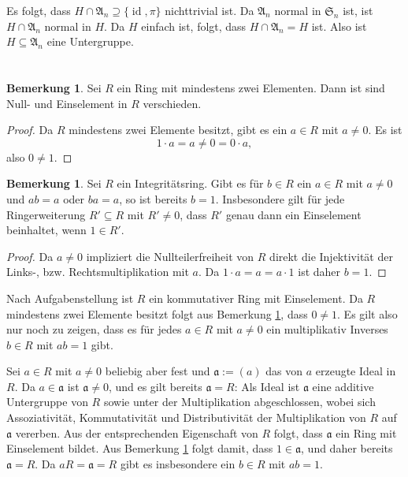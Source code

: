 \documentclass[a4paper,10pt]{article}
\theoremstyle{definition}
\newtheorem{bem}[beh]{Bemerkung}
\newcommand{\Sn}{\mathfrak{S}}
\newcommand{\mf}[1]{\mathfrak{#1}}
\newcommand{\id}{\operatorname{id}}
\begin{document}
Es folgt, dass $H \cap \mf{A}_n \supseteq \{\id, \pi\}$ nichttrivial ist. Da $\mf{A}_n$ normal in $\Sn_n$ ist, ist $H \cap \mf{A}_n$ normal in $H$. Da $H$ einfach ist, folgt, dass $H \cap \mf{A}_n = H$ ist. Also ist $H \subseteq \mf{A}_n$ eine Untergruppe.





\section{}

\begin{bem}\label{bem: 0 neq 1}
 Sei $R$ ein Ring mit mindestens zwei Elementen. Dann ist sind Null- und Einselement in $R$ verschieden.
\end{bem}
\begin{proof}
 Da $R$ mindestens zwei Elemente besitzt, gibt es ein $a \in R$ mit $a \neq 0$. Es ist
 \[
  1 \cdot a = a \neq 0 = 0 \cdot a,
 \]
 also $0 \neq 1$.
\end{proof}

\begin{bem}\label{bem: 1 ohne nullteiler eindeutig}
 Sei $R$ ein Integritätsring. Gibt es für $b \in R$ ein $a \in R$ mit $a \neq 0$ und $ab = a$ oder $ba = a$, so ist bereits $b = 1$. Insbesondere gilt für jede Ringerweiterung $R' \subseteq R$ mit $R' \neq 0$, dass $R'$ genau dann ein Einselement beinhaltet, wenn $1 \in R'$.
 \begin{proof}
  Da $a \neq 0$ impliziert die Nullteilerfreiheit von $R$ direkt die Injektivität der Links-, bzw. Rechtsmultiplikation mit $a$. Da $1 \cdot a = a = a \cdot 1$ ist daher $b = 1$.
 \end{proof}
\end{bem}


Nach Aufgabenstellung ist $R$ ein kommutativer Ring mit Einselement. Da $R$ mindestens zwei Elemente besitzt folgt aus Bemerkung \ref{bem: 0 neq 1}, dass $0 \neq 1$. Es gilt also nur noch zu zeigen, dass es für jedes $a \in R$ mit $a \neq 0$ ein multiplikativ Inverses $b \in R$ mit $ab = 1$ gibt.

Sei $a \in R$ mit $a \neq 0$ beliebig aber fest und $\mf{a} := (a)$ das von $a$ erzeugte Ideal in $R$. Da $a \in \mf{a}$ ist $\mf{a} \neq 0$, und es gilt bereits $\mf{a} = R$: Als Ideal ist $\mf{a}$ eine additive Untergruppe von $R$ sowie unter der Multiplikation abgeschlossen, wobei sich Assoziativität, Kommutativität und Distributivität der Multiplikation von $R$ auf $\mf{a}$ vererben. Aus der entsprechenden Eigenschaft von $R$ folgt, dass $\mf{a}$ ein Ring mit Einselement bildet. Aus Bemerkung \ref{bem: 1 ohne nullteiler eindeutig} folgt damit, dass $1 \in \mf{a}$, und daher bereits $\mf{a} = R$. Da $aR = \mf{a} = R$ gibt es insbesondere ein $b \in R$ mit $ab = 1$.
\end{document}
